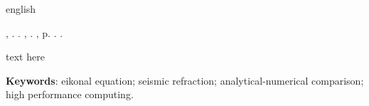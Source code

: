 \begin{resumo}[Abstract]
    \begin{otherlanguage*}{english}

\begin{flushleft}
\MakeUppercase{\imprimirSobrenome}, \imprimirPrimeirosNomes. \textbf{\imprimirTituloEmIngles}. \imprimirtipotrabalhoIngles, \imprimirinstituicaoIngles. \imprimirlocal,  p. \pageref{LastPage}. \imprimirAnoDeDefesa.
\end{flushleft}

        \fonteResumo
		text here
    
        \vspace{\onelineskip}
     
        \noindent 
        \textbf{Keywords}: eikonal equation; seismic refraction; analytical-numerical comparison; high performance computing.
    \end{otherlanguage*}
\end{resumo}
